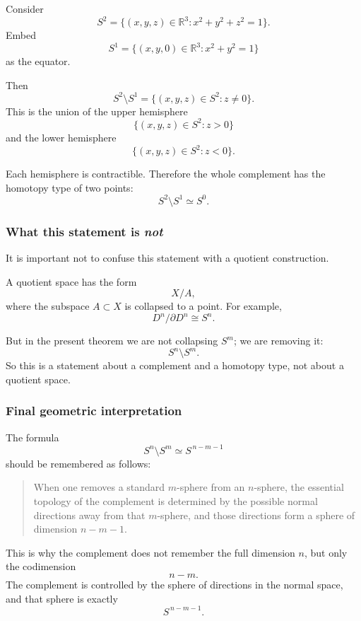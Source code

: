 \documentclass[12pt,a4paper]{article}
\theoremstyle{notespace}
\begin{document}
Consider
\[
S^2
=
\{(x,y,z)\in \mathbb{R}^3 : x^2+y^2+z^2=1\}.
\]
Embed
\[
S^1
=
\{(x,y,0)\in \mathbb{R}^3 : x^2+y^2=1\}
\]
as the equator.

Then
\[
S^2\setminus S^1
=
\{(x,y,z)\in S^2 : z\neq 0\}.
\]
This is the union of the upper hemisphere
\[
\{(x,y,z)\in S^2 : z>0\}
\]
and the lower hemisphere
\[
\{(x,y,z)\in S^2 : z<0\}.
\]

Each hemisphere is contractible. Therefore the whole complement has the homotopy type of two points:
\[
S^2\setminus S^1 \simeq S^0.
\]

\subsubsection{What this statement is \emph{not}}

It is important not to confuse this statement with a quotient construction.

A quotient space has the form
\[
X/A,
\]
where the subspace \(A\subset X\) is collapsed to a point. For example,
\[
D^n/\partial D^n \cong S^n.
\]

But in the present theorem we are not collapsing \(S^m\); we are removing it:
\[
S^n\setminus S^m.
\]
So this is a statement about a complement and a homotopy type, not about a quotient space.

\subsubsection{Final geometric interpretation}

The formula
\[
S^n\setminus S^m \simeq S^{\,n-m-1}
\]
should be remembered as follows:

\begin{quote}
	When one removes a standard \(m\)-sphere from an \(n\)-sphere, the essential topology of the complement is determined by the possible normal directions away from that \(m\)-sphere, and those directions form a sphere of dimension \(n-m-1\).
\end{quote}

This is why the complement does not remember the full dimension \(n\), but only the codimension
\[
n-m.
\]
The complement is controlled by the sphere of directions in the normal space, and that sphere is exactly
\[
S^{\,n-m-1}.
\]
	
\end{document}
